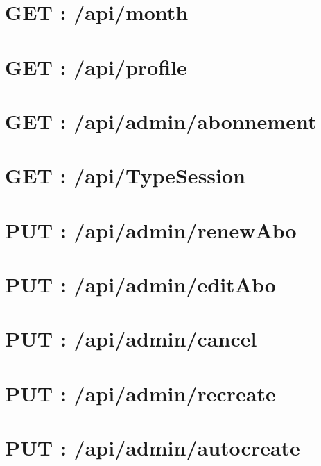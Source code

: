 \vspace{\baselineskip}
\section{GET : /api/month}
	
	

\vspace{\baselineskip}
\section{GET : /api/profile}
	
	

\newpage
\section{GET : /api/admin/abonnement}
	
	
	
\newpage
\section{GET : /api/TypeSession}
	


\vspace{\baselineskip}
\section{PUT : /api/admin/renewAbo}
	
	
	
\vspace{\baselineskip}
\section{PUT : /api/admin/editAbo}
	
	

\vspace{\baselineskip}
\section{PUT : /api/admin/cancel}
	
	
	
\vspace{\baselineskip}
\section{PUT : /api/admin/recreate}
	
	
	
\newpage
\section{PUT : /api/admin/autocreate}
	
	
